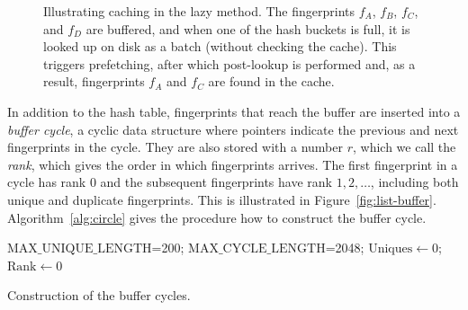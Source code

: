 \documentclass[prodmode,acmtecs]{acmsmall}
\begin{document}
\begin{figure}[htbp]
{
}
\caption{Illustrating caching in the lazy method.  The fingerprints $f_A$, $f_B$, $f_C$, and $f_D$ are buffered, and when one of the hash buckets is full, it is looked up on disk as a batch (without checking the cache).  This triggers prefetching, after which post-lookup is performed and, as a result, fingerprints $f_A$ and $f_C$ are found in the cache.}
\label{fig:cache-lazy}
\end{figure}

In addition to the hash table, fingerprints that reach the buffer are inserted into a \emph{buffer cycle}, a cyclic data structure where pointers indicate the previous and next fingerprints in the cycle.   They are also stored with a number $r$, which we call the \emph{rank}, which gives the order in which fingerprints arrives.  The first fingerprint in a cycle has rank $0$ and the subsequent fingerprints have rank $1,2,\ldots$, including both unique and duplicate fingerprints.  This is illustrated in Figure~\ref{fig:list-buffer}. Algorithm~\ref{alg:circle} gives the procedure how to construct the buffer cycle.

\begin{algorithm}[htbp]
\SetAlgoNoLine
{}
$\mathrm{MAX\_UNIQUE\_LENGTH}$=200; $\mathrm{MAX\_CYCLE\_LENGTH}$=2048; $\mathrm{Uniques} \gets 0$; $\mathrm{Rank} \gets 0$\;
\caption{Construction of the buffer cycles.}
\label{alg:circle}
\end{algorithm}
\end{document}
